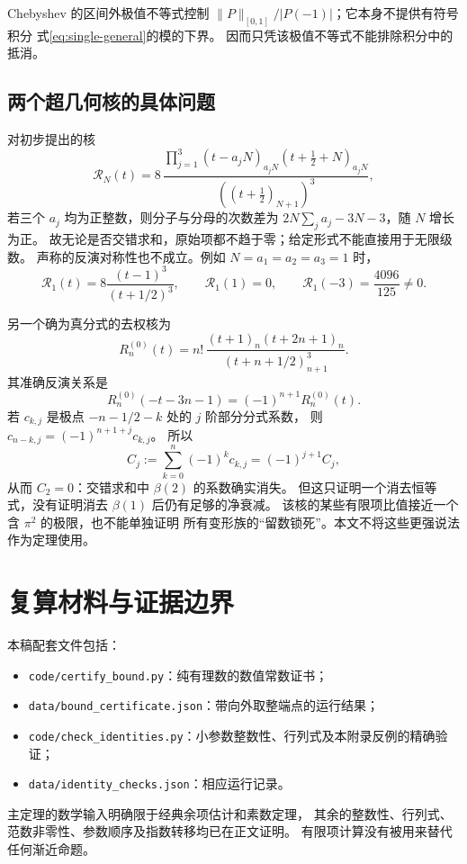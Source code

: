\documentclass[UTF8,fontset=fandol,a4paper,11pt]{ctexart}
\theoremstyle{remark}
\numberwithin{equation}{section}
\begin{document}
Chebyshev 的区间外极值不等式控制
$\|P\|_{[0,1]}/|P(-1)|$；它本身不提供有符号积分
式\eqref{eq:single-general}的模的下界。
因而只凭该极值不等式不能排除积分中的抵消。

\subsection{两个超几何核的具体问题}

对初步提出的核
\[
\mathcal R_N(t)=8\,
\frac{\prod_{j=1}^{3}(t-a_jN)_{a_jN}
 (t+\tfrac12+N)_{a_jN}}
 {((t+\tfrac12)_{N+1})^3},
\]
若三个 $a_j$ 均为正整数，则分子与分母的次数差为
$2N\sum_j a_j-3N-3$，随 $N$ 增长为正。
故无论是否交错求和，原始项都不趋于零；给定形式不能直接用于无限级数。
声称的反演对称性也不成立。例如 $N=a_1=a_2=a_3=1$ 时，
\[
\mathcal R_1(t)=8\frac{(t-1)^3}{(t+1/2)^3},\qquad
\mathcal R_1(1)=0,\qquad \mathcal R_1(-3)=\frac{4096}{125}\ne0.
\]

另一个确为真分式的去权核为
\[
R_n^{(0)}(t)=n!\,
\frac{(t+1)_n(t+2n+1)_n}{(t+n+1/2)_{n+1}^3}.
\]
其准确反演关系是
\[
R_n^{(0)}(-t-3n-1)=(-1)^{n+1}R_n^{(0)}(t).
\]
若 $c_{k,j}$ 是极点 $-n-1/2-k$ 处的 $j$ 阶部分分式系数，
则
$c_{n-k,j}=(-1)^{n+1+j}c_{k,j}$。
所以
\[
C_j:=\sum_{k=0}^{n}(-1)^k c_{k,j}
 =(-1)^{j+1}C_j,
\]
从而 $C_2=0$：交错求和中 $\beta(2)$ 的系数确实消失。
但这只证明一个消去恒等式，没有证明消去 $\beta(1)$ 后仍有足够的净衰减。
该核的某些有限项比值接近一个含 $\pi^2$ 的极限，也不能单独证明
所有变形族的“留数锁死”。本文不将这些更强说法作为定理使用。

\clearpage
\section{复算材料与证据边界}

本稿配套文件包括：
\begin{itemize}
\item \texttt{code/certify\_bound.py}：纯有理数的数值常数证书；
\item \texttt{data/bound\_certificate.json}：带向外取整端点的运行结果；
\item \texttt{code/check\_identities.py}：小参数整数性、行列式及本附录反例的精确验证；
\item \texttt{data/identity\_checks.json}：相应运行记录。
\end{itemize}
主定理的数学输入明确限于经典余项估计和素数定理，
其余的整数性、行列式、范数非零性、参数顺序及指数转移均已在正文证明。
有限项计算没有被用来替代任何渐近命题。
\end{document}
